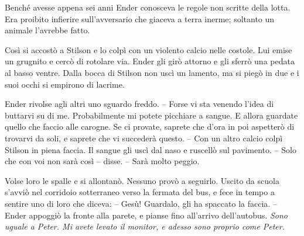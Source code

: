 {Benché avesse appena sei anni Ender conosceva le regole non scritte
	della lotta. Era proibito infierire sull'avversario che giaceva a terra
	inerme; soltanto un animale l'avrebbe fatto.}

{Così si accostò a Stilson e lo colpì con un violento calcio nelle
	costole. Lui emise un grugnito e cercò di rotolare via. Ender gli girò
	attorno e gli sferrò una pedata al basso ventre. Dalla bocca di Stilson
	non uscì un lamento, ma si piegò in due e i suoi occhi si empirono di
	lacrime.}

{Ender rivolse agli altri uno sguardo freddo. -- Forse vi sta venendo
	l'idea di buttarvi su di me. Probabilmente mi potete picchiare a sangue.
	E allora guardate quello che faccio alle carogne. Se ci provate, saprete
	che d'ora in poi aspetterò di trovarvi da soli, e saprete che vi
	succederà questo. -- Con un altro calcio colpì Stilson in piena faccia.
	Il sangue gli uscì dal naso e ruscellò sul pavimento. -- Solo che con
	voi non sarà così -- disse. -- Sarà molto peggio.}

{Volse loro le spalle e si allontanò. Nessuno provò a seguirlo. Uscito
	da scuola s'avviò nel corridoio sotterraneo verso la fermata del bus, e
	fece in tempo a sentire uno di loro che diceva: -- Gesù! Guardalo, gli
	ha spaccato la faccia. -- Ender appoggiò la fronte alla parete, e pianse
	fino all'arrivo dell'autobus. \emph{Sono uguale a Peter. Mi avete levato
		il monitor, e adesso sono proprio come Peter.}}
